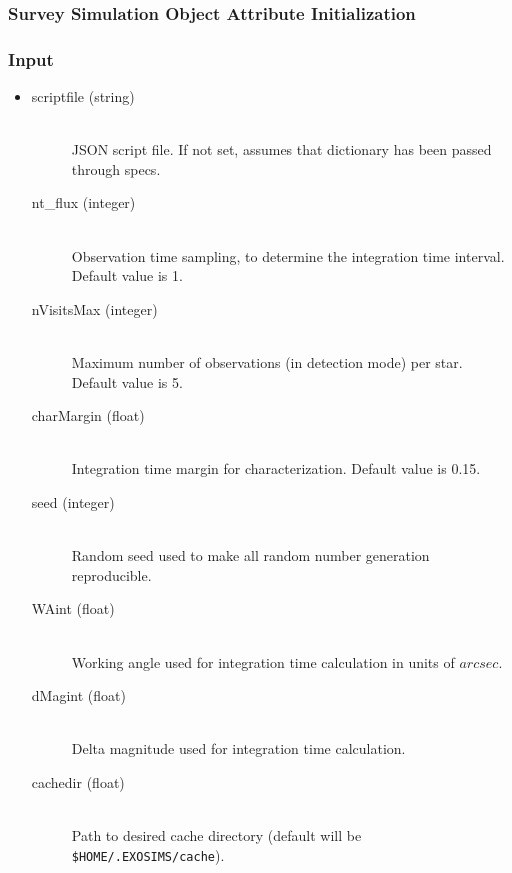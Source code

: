 \documentclass[cleanfoot]{asme2ej}
\begin{document}

\subsubsection{Survey Simulation Object Attribute Initialization}

\subsubsection*{Input}
\begin{itemize}
\item 
\begin{description}
    \item[scriptfile (string)] \hfill \\ JSON script file.  If not set, assumes that dictionary has been passed through specs.
    \item[nt\_flux (integer)] \hfill \\ Observation time sampling, to determine the integration time interval. Default value is 1.
    \item[nVisitsMax (integer)] \hfill \\ Maximum number of observations (in detection mode) per star. Default value is 5.
    \item[charMargin (float)] \hfill \\ Integration time margin for characterization. Default value is 0.15.
    \item[seed (integer)] \hfill \\ Random seed used to make all random number generation reproducible.
    \item[WAint (float)] \hfill \\ Working angle used for integration time calculation in units of $arcsec$.
    \item[dMagint (float)] \hfill \\ Delta magnitude used for integration time calculation.
    \item[cachedir (float)] \hfill \\ Path to desired cache directory (default will be \texttt{\$HOME/.EXOSIMS/cache}).
\end{description}
\end{itemize}
\end{document}
